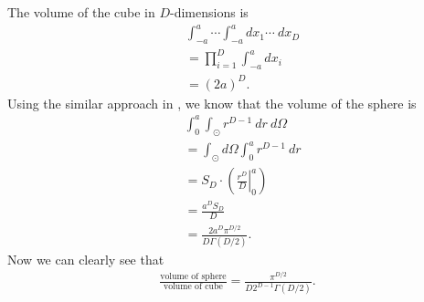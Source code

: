\begin{answer}{}
	The volume of the cube in $D$-dimensions is
	\begin{align}
		&\int_{-a}^{a} \cdots \int_{-a}^{a} dx_1\cdots\ dx_D\\
		&= \prod_{i = 1}^{D} \int_{-a}^{a} dx_i\\
		&= (2a)^D.
	\end{align}
	Using the similar approach in , we know that the volume of the sphere is
	\begin{align}
		&\int_{0}^{a} \int_{\odot} r^{D-1}\ dr\ d\Omega\\
		&= \int_{\odot} d\Omega \int_{0}^{a} r^{D-1}\ dr\\
		&= S_D \cdot \left( \left. \frac{r^D}{D} \right\rvert_{0}^{a} \right)\\
		&= \frac{a^DS_D}{D}\\
		&= \frac{2a^D\pi^{D/2}}{D\Gamma(D/2)}.
	\end{align}
	Now we can clearly see that
	\begin{align}\label{1.19eqn1}
		\frac{\mbox{volume of sphere}}{\mbox{volume of cube}} = \frac{\pi^{D/2}}{D2^{D-1}\Gamma(D/2)}.
	\end{align}
	

\end{answer}
